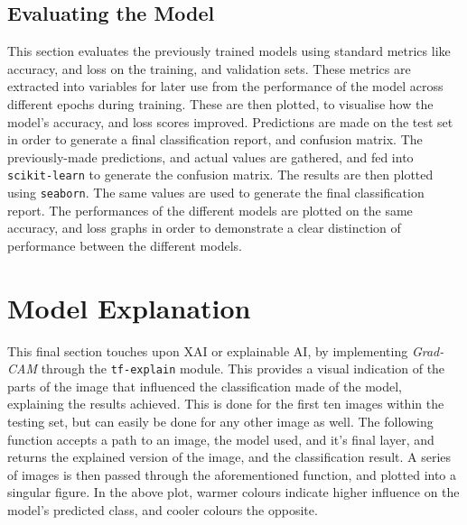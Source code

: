 \documentclass[../main]{subfiles}
\begin{document}
\subsection{Evaluating the Model}
This section evaluates the previously trained models using standard metrics like
accuracy, and loss on the training, and validation sets. These metrics are
extracted into variables for later use from the performance of the model across
different epochs during training. These are then plotted, to visualise how the
model's accuracy, and loss scores improved. Predictions are made on the test set
in order to generate a final classification report, and confusion matrix. The
previously-made predictions, and actual values are gathered, and fed into
\texttt{scikit-learn} to generate the confusion matrix. The results are then
plotted using \texttt{seaborn}. The same values are used to generate the final
classification report. The performances of the different models are plotted on
the same accuracy, and loss graphs in order to demonstrate a clear distinction
of performance between the different models.
 
\section{Model Explanation}
This final section touches upon XAI or explainable AI, by implementing
\emph{Grad-CAM} through the \texttt{tf-explain} module. This provides a visual
indication of the parts of the image that influenced the classification made of
the model, explaining the results achieved. This is done for the first ten
images within the testing set, but can easily be done for any other image as
well. The following function accepts a path to an image, the model used, and
it's final layer, and returns the explained version of the image, and the
classification result. A series of images is then passed through the
aforementioned function, and plotted into a singular figure. In the above plot,
warmer colours indicate higher influence on the model's predicted class, and
cooler colours the opposite.
\end{document}
